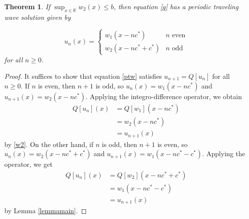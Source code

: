 \documentclass[11pt]{article}
\newtheorem{thm}{Theorem}
\theoremstyle{definition}
\numberwithin{equation}{section}
\numberwithin{thm}{section}
\renewcommand{\b}{b}
\begin{document}
\begin{thm} \label{theorem1}
If $\sup_{x\in\mathbb R}w_2(x)\leq \b$, then equation \eqref{q} has a periodic traveling wave solution given by %

\begin{equation} \label{ptw}
u_n(x) = \begin{cases}
w_1(x-nc^*) & n \text{ even} \\
w_2(x-nc^*+c^*) & n \text{ odd}
\end{cases}
\end{equation}
for all $n \geq 0$.
\end{thm}

\begin{proof}
It suffices to show that equation \eqref{ptw} satisfies $u_{n+1}=Q[u_n]$ for all $n \geq 0$. If $n$ is even, then $n+1$ is odd, so $u_n(x)=w_1(x-nc^*)$ and $u_{n+1}(x)=w_2(x-nc^*)$. Applying the integro-difference operator, we obtain
\begin{equation} \begin{aligned}
Q[u_n](x) &= Q[w_1](x-nc^*) \\
&= w_2(x-nc^*) \\
&= u_{n+1}(x)
\end{aligned} \end{equation}
by \eqref{w2}. On the other hand, if $n$ is odd, then $n+1$ is even, so $u_n(x)=w_2(x-nc^*+c^*)$ and $u_{n+1}(x)=w_1(x-nc^*-c^*)$. Applying the operator, we get
\begin{equation} \begin{aligned}
Q[u_n](x) &= Q[w_2](x-nc^*+c^*) \\
&= w_1(x-nc^*-c^*) \\
&= u_{n+1}(x)
\end{aligned} \end{equation}
by Lemma \ref{lemmamain}.
\end{proof}


%
\end{document}

